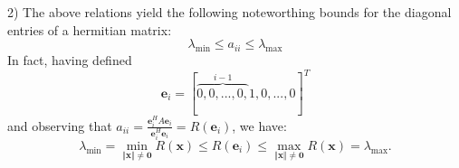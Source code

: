 \documentclass[12pt]{article}
\begin{document}
2) The above relations yield the following noteworthing bounds for the
diagonal entries of a hermitian matrix:
\begin{equation*}
\lambda _{\min }\leq a_{ii}\leq \lambda _{\max }
\end{equation*}
In fact, having defined 
\begin{equation*}
\mathbf{e}_{i}=[\overbrace{0,0,...,0,}^{i-1}1,0,...,0]^{T}
\end{equation*}
and observing that $a_{ii}=\frac{\mathbf{e}_{i}^{H}A\mathbf{e}_{i}}{\mathbf{e}_{i}^{H}\mathbf{e}_{i}}=R(\mathbf{e}_{i})$, we have:
\begin{equation*}
\lambda _{\min }=\min_{\Vert \mathbf{x\Vert \neq 0}}R(\mathbf{x})\leq R(\mathbf{e}_{i})\leq \max_{\Vert \mathbf{x\Vert \neq 0}}R(\mathbf{x})=\lambda
_{\max }\text{.}
\end{equation*}
\end{document}
